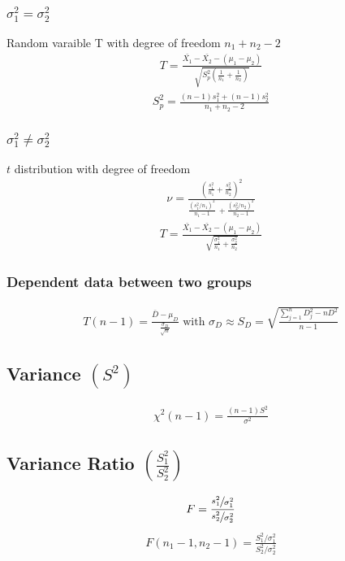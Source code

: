 \documentclass[twocolumn]{article}
\begin{document}
\subsubsection{$\sigma_{1}^{2} = \sigma_{2}^{2}$}
Random varaible T with degree of freedom $n_{1}+n_{2}-2$
\begin{align*}
    T = \frac{\bar{X_{1}} - \bar{X_{2}} - (\mu_{1} - \mu_{2})}{\sqrt{S_{p}^{2}(\frac{1}{n_{1}} + \frac{1}{n_{2}})}}
\end{align*}
\begin{align*}
    S^{2}_{p} = \frac{(n-1)s_{1}^{2}+(n-1)s_{2}^{2}}{n_{1} + n_{2} - 2}
\end{align*}
\subsubsection{$\sigma_{1}^{2} \neq \sigma_{2}^{2}$}
$t$ distribution with degree of freedom
\begin{align*}
    \nu = \frac{(\frac{s_{1}^{2}}{n_{1}} + \frac{s_{2}^{2}}{n_{2}})^{2}}{\frac{(s_{1}^{2}/n_{1})^{2}}{n_{1} - 1}\frac{}{} + \frac{(s_{2}^{2}/n_{2})^{2}}{n_{2} - 1}}
\end{align*}
\begin{align*}
    T = \frac{\bar{X_{1}} - \bar{X_{2}} - (\mu_{1} - \mu_{2})}{\sqrt{\frac{\sigma_{1}^{2}}{n_{1}} + \frac{\sigma_{2}^{2}}{n_{2}}}}
\end{align*}
\subsubsection{Dependent data between two groups}
\begin{align*}
    T(n-1) = \frac{\bar{D} - \mu_{D}}{\frac{\sigma_{D}}{\sqrt{n}}} \text{ with } \sigma_{D} \approx S_{D} = \sqrt{\frac{\sum_{j=1}^{n}D_{j}^{2} - nD^{2}}{n-1}}
\end{align*}
\subsection{Variance $(S^{2})$}
\begin{align*}
    \chi^{2}(n-1) = \frac{(n-1)S^{2}}{\sigma^{2}}
\end{align*}
\subsection{Variance Ratio $(\frac{S_{1}^{2}}{S_{2}^{2}})$}
\begin{align*}
    F = \frac{\sfrac{s_{1}^{2}}{\sigma_{1}^{2}}}{\sfrac{s_{2}^{2}}{\sigma_{2}^{2}}}
\end{align*}
\begin{align*}
    F(n_{1}-1, n_{2}-1) = \frac{S_{1}^2 / \sigma_{1}^{2}}{S_{2}^2 / \sigma_{2}^{2}}
\end{align*}
\end{document}
